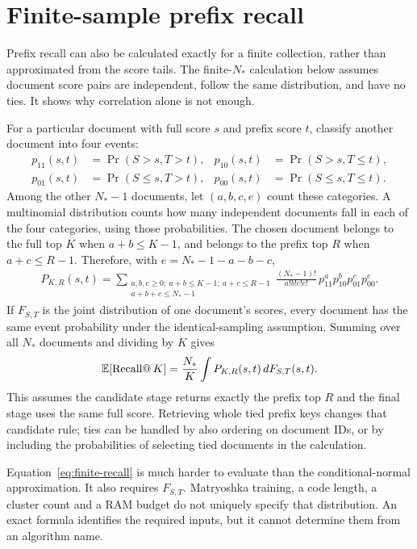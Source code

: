 \section{Finite-sample prefix recall}
Prefix recall can also be calculated exactly for a finite collection, rather than approximated
from the score tails. The finite-$N_*$ calculation below assumes document score pairs
are independent, follow the same distribution, and have no ties. It shows why correlation
alone is not enough.

For a particular document with full score $s$ and prefix score $t$, classify another document
into four events:
\begin{align*}
p_{11}(s,t)&=\Pr(S>s,T>t),&p_{10}(s,t)&=\Pr(S>s,T\leq t),\\
p_{01}(s,t)&=\Pr(S\leq s,T>t),&p_{00}(s,t)&=\Pr(S\leq s,T\leq t).
\end{align*}
Among the other $N_*-1$ documents, let $(a,b,c,e)$ count these categories. A multinomial distribution counts how many independent documents fall in each of the four categories, using those probabilities. The chosen document belongs to the full
top $K$ when $a+b\leq K-1$, and belongs to the prefix top $R$ when $a+c\leq R-1$.
Therefore, with $e=N_*-1-a-b-c$,
\begin{align}
P_{K,R}(s,t)=
\sum_{\substack{a,b,c\geq0;\ a+b\leq K-1;\ a+c\leq R-1\\a+b+c\leq N_*-1}}
\frac{(N_*-1)!}{a!b!c!e!}\,
p_{11}^{a}p_{10}^{b}p_{01}^{c}p_{00}^{e}.
\end{align}
If $F_{S,T}$ is the joint distribution of one document's scores, every document has the same event probability under the identical-sampling assumption. Summing over all $N_*$ documents and dividing by $K$ gives
\begin{equation}
\mathbb E[\operatorname{Recall@}K]=
\frac{N_*}{K}\int P_{K,R}(s,t)\,dF_{S,T}(s,t).
\label{eq:finite-recall}
\end{equation}
This assumes the candidate stage returns exactly the prefix top $R$ and the final stage uses
the same full score. Retrieving whole tied prefix keys changes that candidate rule; ties can
be handled by also ordering on document IDs, or by including the probabilities of selecting
tied documents in the calculation.

Equation~\eqref{eq:finite-recall} is much harder to evaluate than the conditional-normal
approximation. It also requires $F_{S,T}$. Matryoshka training, a code length,
a cluster count and a RAM budget do not uniquely specify that distribution. An exact formula identifies the required inputs, but it cannot determine them from an
algorithm name.

